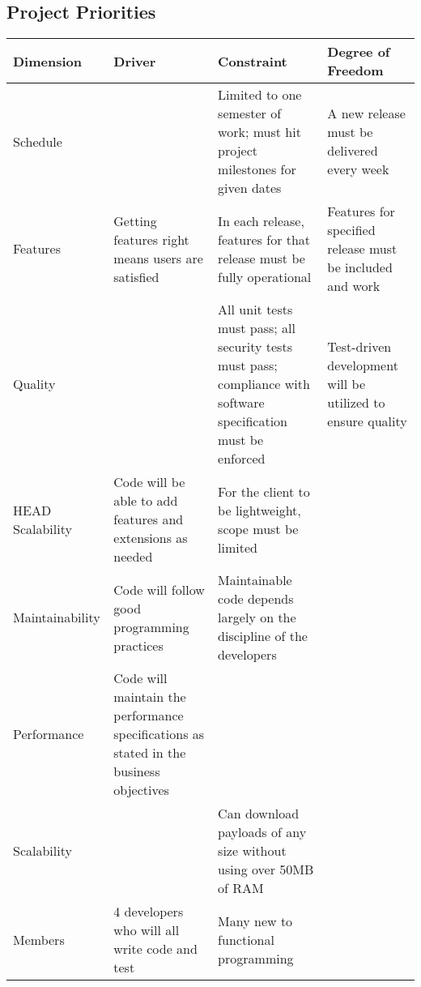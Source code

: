 \documentclass[letter]{scrartcl}
\begin{document}
\subsection{Project Priorities}
\begin{tabularx}{\textwidth}{| X | X | X | X |}
\hline
\textbf{Dimension} & \textbf{Driver} & \textbf{Constraint} & \textbf{Degree of Freedom} \\
\hline
\hline
Schedule & & Limited to one semester of work; must hit project milestones for given dates & A new release must be delivered every week \\
\hline
Features & Getting features right means users are satisfied & In each release, features for that release must be fully operational & Features for specified release must be included and work \\
\hline
Quality  & & All unit tests must pass; all security tests must pass; compliance with software specification must be enforced & Test-driven development will be utilized to ensure quality\\
\hline
HEAD
Scalability & Code will be able to add features and extensions as needed & For the client to be lightweight, scope must be limited & \\
\hline
Maintainability & Code will follow good programming practices & Maintainable code depends largely on the discipline of the developers &  \\
\hline
Performance & Code will maintain the performance specifications as stated in the business objectives &  & \\
\hline
Scalability & & Can download payloads of any size without using over 50MB of RAM & \\
\hline
Members  & 4 developers who will all write code and test & Many new to functional programming & \\
\hline
\end{tabularx}
\end{document}
